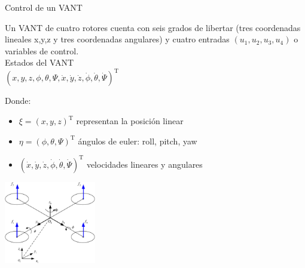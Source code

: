 \documentclass[
  24pt, %
  aspectratio=169, %
]{beamer}
\begin{document}
\begin{frame}{Control de un VANT}

  \begin{minipage}{0.47\textwidth}
    
    \small Un VANT de cuatro rotores cuenta con seis grados de libertar (tres coordenadas lineales x,y,z y tres coordenadas angulares) y cuatro entradas $(u_1,u_2,u_3,u_4)$ o variables de control.\\
    
    Estados del VANT \\
    $(x,y,z,\phi,\theta,\Psi,\dot{x},\dot{y},\dot{z},\dot{\phi},\dot{\theta},\dot{\Psi})^\mathrm{T}$

    \bigskip %
    
    Donde:
    \begin{itemize}
    \item $\xi = (x,y,z)^\mathrm{T}$ representan la posición linear
    \item $\eta = (\phi,\theta,\Psi)^\mathrm{T}$ ángulos de euler: roll, pitch, yaw
    \item $(\dot{x},\dot{y},\dot{z},\dot{\phi},\dot{\theta},\dot{\Psi})^\mathrm{T}$ velocidades lineares y angulares
    \end{itemize}
  \end{minipage}
  \hspace{0.2cm}
  \begin{minipage}{0.5\textwidth}
    \centering
    \includegraphics[width=4cm]{uav_model.jpeg}
    \bigskip %
  \end{minipage}
\end{frame}
\end{document}
